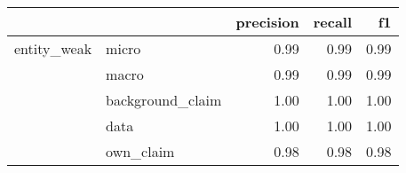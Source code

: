 \begin{tabular}{llrrr}
\toprule
            &           &  precision &  recall &   f1 \\
\midrule
entity\_weak & micro &       0.99 &    0.99 & 0.99 \\
            & macro &       0.99 &    0.99 & 0.99 \\
            & background\_claim &       1.00 &    1.00 & 1.00 \\
            & data &       1.00 &    1.00 & 1.00 \\
            & own\_claim &       0.98 &    0.98 & 0.98 \\
\bottomrule
\end{tabular}
